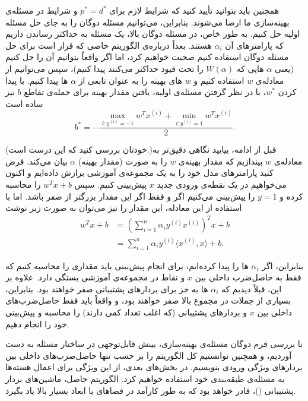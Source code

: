 \documentclass[12pt]{article}
\begin{document}
همچنین باید بتوانید تأیید کنید که شرایط لازم برای
$p^* = d^*$
و شرایط
در مسئله‌ی بهینه‌سازی ما ارضا می‌شوند. بنابراین، می‌توانیم مسئله دوگان را به جای حل مسئله اولیه حل کنیم. به طور خاص، در مسئله دوگان بالا، یک مسئله به حداکثر رساندن داریم که پارامترهای آن
$\alpha_i$
هستند. بعداً درباره‌ی الگوریتم خاصی که قرار است برای حل مسئله دوگان استفاده کنیم صحبت خواهیم کرد، اما اگر واقعاً بتوانیم آن را حل کنیم (یعنی
$\alpha$
هایی که
$W(\alpha)$
را تحت قیود حداکثر می‌کنند پیدا کنیم)، سپس می‌توانیم از معادله‌ی
$w$
استفاده کنیم و
$w$
های بهینه را به عنوان تابعی از
$\alpha$
ها پیدا کنیم. با پیدا کردن
$w^*$،
با در نظر گرفتن مسئله‌ی اولیه، یافتن مقدار بهینه برای جمله‌ی تقاطع
$b$
نیز ساده است
$$b^* = -\frac{\max_{i: y^{(i)} = -1} w^T x^{(i)} + \min_{i: y^{(i)} = 1} w^T x^{(i)}}{2}.$$

(خودتان بررسی کنید که این درست است.)قبل از ادامه، بیایید نگاهی دقیق‌تر به معادله‌ی
$w$
بیندازیم که مقدار بهینه‌ی
$w$
را به صورت (مقدار بهینه)
$\alpha$
بیان می‌کند. فرض کنید پارامترهای مدل خود را به یک مجموعه‌ی آموزشی برازش داده‌ایم و اکنون می‌خواهیم در یک نقطه‌ی ورودی جدید
$x$
پیش‌بینی کنیم. سپس
$w^T x + b$
را محاسبه کرده و
$y = 1$
را پیش‌بینی می‌کنیم اگر و فقط اگر این مقدار بزرگتر از صفر باشد. اما با استفاده از این معادله، این مقدار را نیز می‌توان به صورت زیر نوشت
\begin{align*}
    w^T x + b &= \left( \sum_{i=1}^n \alpha_i y^{(i)} x^{(i)} \right)^T x + b \\
    &= \sum_{i=1}^n \alpha_i y^{(i)} \langle x^{(i)}, x \rangle + b.
\end{align*}

بنابراین، اگر
$\alpha_i$
ها را پیدا کرده‌ایم، برای انجام پیش‌بینی باید مقداری را محاسبه کنیم که فقط به حاصل‌ضرب داخلی بین
$x$
و نقاط در مجموعه‌ی آموزشی بستگی دارد. علاوه بر این، قبلاً دیدیم که
$\alpha_i$
ها به جز برای بردارهای پشتیبانی صفر خواهند بود. بنابراین، بسیاری از جملات در مجموع بالا صفر خواهند بود، و واقعاً باید فقط حاصل‌ضرب‌های داخلی بین
$x$
و بردارهای پشتیبانی (که اغلب تعداد کمی دارند) را محاسبه و پیش‌بینی خود را انجام دهیم.

با بررسی فرم دوگان مسئله‌ی بهینه‌سازی، بینش قابل‌توجهی در ساختار مسئله به دست آوردیم، و همچنین توانستیم کل الگوریتم را بر حسب تنها حاصل‌ضرب‌های داخلی بین بردارهای ویژگی ورودی بنویسیم. در بخش‌های بعدی، از این ویژگی برای اعمال هسته‌ها به مسئله‌ی طبقه‌بندی خود استفاده خواهیم کرد. الگوریتم حاصل، ماشین‌های بردار پشتیبانی
()،
قادر خواهد بود که به طور کارآمد در فضاهای با ابعاد بسیار بالا یاد بگیرد.
\end{document}
